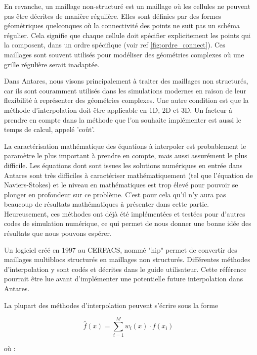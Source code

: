 En revanche, un maillage non-structuré est un maillage où les cellules ne peuvent pas être décrites de manière régulière. Elles sont définies par des formes géométriques quelconques où la connectivité des points ne suit pas un schéma régulier. Cela signifie que chaque cellule doit spécifier explicitement les points qui la composent, dans un ordre spécifique (voir ref \ref{fig:ordre_connect}). Ces maillages sont souvent utilisés pour modéliser des géométries complexes où une grille régulière serait inadaptée.

Dans Antares, nous visons principalement à traiter des maillages non structurés, car ils sont couramment utilisés dans les simulations modernes en raison de leur flexibilité à représenter des géométries complexes. Une autre condition est que la méthode d'interpolation doit être applicable en 1D, 2D et 3D. Un facteur à prendre en compte dans la méthode que l'on souhaite implémenter est aussi le temps de calcul, appelé 'coût'.

La caractérisation mathématique des équations à interpoler est probablement le paramètre le plus important à prendre en compte, mais aussi assurément le plus difficile. Les équations dont sont issues les solutions numériques en entrée dans Antares sont très difficiles à caractériser mathématiquement (tel que l'équation de Naviers-Stokes) et le niveau en mathématiques est trop élevé pour pouvoir se plonger en profondeur sur ce problème\cite{gordont1971_2}. C'est pour cela qu'il n'y aura pas beaucoup de résultats mathématiques à présenter dans cette partie.
Heureusement, ces méthodes ont déjà été implémentées et testées pour d'autres codes de simulation numérique, ce qui permet de nous donner une bonne idée des résultats que nous pouvons espérer.


Un logiciel créé en 1997 au CERFACS, nommé "hip" permet de convertir des maillages multiblocs structurés en maillages non structurés.
Différentes méthodes d'interpolation y sont codés et décrites dans le guide utilisateur\cite{muller2020}. Cette référence pourrait être lue avant d'implémenter une potentielle future interpolation dans Antares.

La plupart des méthodes d'interpolation peuvent s'écrire sous la forme

\[
\hat{f}(x) = \sum_{i=1}^{M} w_i(x) \cdot f(x_i)
\]

où :

